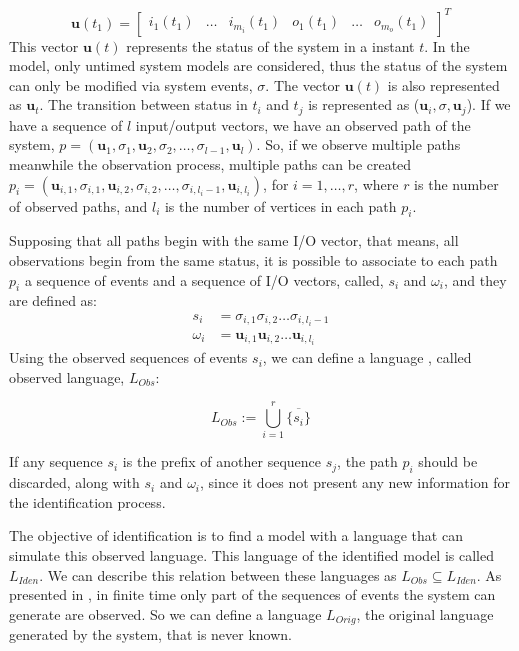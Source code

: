 \begin{equation*}
\mathbf{u}(t_1)=
\begin{bmatrix}
  i_1(t_1)&
  \dots&
  i_{m_i}(t_1)&
  o_1(t_1)&
  \dots&
  o_{m_o}(t_1)
\end{bmatrix}^T
\end{equation*}
\newcommand{\vu}{\mathbf{u}}
 This vector $\mathbf{u}(t)$ represents the status of the system in a instant
 $t$. In the \DAOCT{} model, only untimed system models are considered, thus
 the status of the system can only be modified via system events, $\sigma$.
The vector $\mathbf{u}(t)$ is also represented as $\vu_t$.
 The
 transition between status in $t_i$ and $t_j$ is represented as ($\vu_i,\sigma,\vu_j$). If we have a sequence of
 $l$ input\slash output vectors, we have an observed path of the system,
 $p=(\vu_1,\sigma_1,\vu_2,\sigma_2,\dots,\sigma_{l-1},\vu_l)$.
So, if we observe multiple paths meanwhile the observation process, 
multiple paths can be created
$p_i=(\vu_{i,1},\sigma_{i,1},\vu_{i,2},\sigma_{i,2},\dots,\sigma_{i,l_i-1},\vu_{i,l_i})$,
for $i=1,\dots,r$, where $r$ is the number of observed paths, and $l_i$ is the
number of vertices in each path $p_i$.

Supposing that all paths begin with the same I\slash O vector, that means, all
observations begin from the same status, it is possible to associate to each
path $p_i$ a sequence of events and a sequence of I\slash O vectors, called,
$s_i$ and $\omega_i$, and they are defined as:
\begin{align*}
  s_i&= \sigma_{i,1}\sigma_{i,2}\dots\sigma_{i,l_i-1} \\
  \omega_i&= \vu_{i,1}\vu_{i,2}\dots\vu_{i,l_i}
\end{align*}
Using the observed sequences of events $s_i$, we can define a language
, called observed language, $L_{Obs}$:

\begin{equation}
  L_{Obs}:= \bigcup^r_{i=1}\overline{\{s_i\}}
\end{equation}
\begin{observation}
If any sequence $s_i$ is the prefix of another sequence $s_j$, the path $p_i$ should
be discarded, along with $s_i$ and $\omega_i$, since it does not present any new
information for the identification process.
\end{observation}
The objective of identification is to find a model with a language that
can simulate this observed language. This language of the identified model is
called $L_{Iden}$.
We can describe this relation between these languages as $L_{Obs} \subseteq
L_{Iden}$.
As presented in
\cite{moreira2018enhanced}, in finite time only part of the sequences  of events
the system can generate are observed. So we can define a language $L_{Orig}$,
the original language generated by the system, that is never known.

